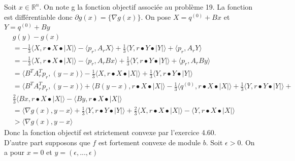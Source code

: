 \documentclass[11pt]{article}
\newcommand{\R}{\mathbb{R}^n}
\begin{document}
Soit $x\in\R$. On note g la fonction objectif associée au problème 19. La fonction est différentiable donc $\partial g(x) = \{\nabla g(x)\}$. On pose $X = q^{(0)} + Bx$ et $Y = q^{(0)} + By$
\begin{align*}
&g(y) - g(x) \\
&= -\frac{1}{3} \langle X,r \bullet X \bullet |X|\rangle  - \langle p_r,A_rX\rangle  + \frac{1}{3}\langle Y,r \bullet Y \bullet |Y|\rangle  + \langle p_r,A_rY\rangle   \\
&= -\frac{1}{3} \langle X,r \bullet X \bullet |X|\rangle  - \langle p_r,A_rBx\rangle  + \frac{1}{3}\langle Y,r \bullet Y \bullet |Y|\rangle  + \langle p_r,A_rBy\rangle   \\
&= \langle B^TA_r^Tp_r,(y - x)\rangle -\frac{1}{3} \langle X,r \bullet X \bullet |X|\rangle + \frac{1}{3}\langle Y,r \bullet Y \bullet |Y|\rangle \\
&= \langle B^TA_r^Tp_r,(y - x)\rangle + \langle B(y-x),r \bullet X \bullet |X|\rangle - \frac{1}{3}\langle q^{(0)},r \bullet X \bullet |X|\rangle + \frac{1}{3}\langle Y,r \bullet Y \bullet |Y|\rangle + \\
&\frac{2}{3} \langle Bx,r \bullet X \bullet |X|\rangle -  \langle By,r \bullet X \bullet |X|\rangle\\
&=  \langle \nabla g(x),y-x\rangle + \frac{1}{3}\langle Y,r \bullet Y \bullet |Y|\rangle + \frac{2}{3} \langle X,r \bullet X \bullet |X|\rangle -  \langle Y,r \bullet X \bullet |X|\rangle \\
& \boxed{ > \langle \nabla g(x),y-x\rangle \tag{Par le lemme du début} }
\end{align*}
Donc la fonction objectif est strictement convexe par l'exercice 4.60. \\
D'autre part supposons que $f$ est fortement convexe de module $b$. Soit $\epsilon>0$. On a pour $x = 0$ et $y = (\epsilon,...,\epsilon)$
\end{document}
